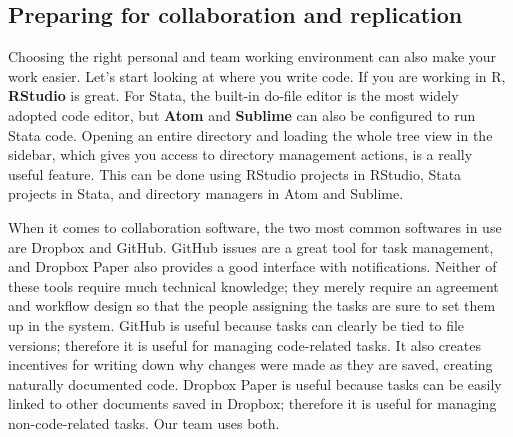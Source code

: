 \subsection{Preparing for collaboration and replication}

Choosing the right personal and team working environment can also make your work easier.
Let's start looking at where you write code.
If you are working in R, \textbf{RStudio} is great.
For Stata, the built-in do-file editor is the most widely adopted code editor,
but \textbf{Atom} and \textbf{Sublime} can also be configured to run Stata code.
Opening an entire directory and loading the whole tree view in the sidebar,
which gives you access to directory management actions, is a really useful feature.
This can be done using RStudio projects in RStudio, Stata projects in Stata, and directory managers in Atom and Sublime.


When it comes to collaboration software,
the two most common softwares in use are Dropbox and GitHub.
GitHub issues are a great tool for task management,
and Dropbox Paper also provides a good interface with notifications.
Neither of these tools require much technical knowledge;
they merely require an agreement and workflow design
so that the people assigning the tasks
are sure to set them up in the system.
GitHub is useful because tasks can clearly be tied to file versions;
therefore it is useful for managing code-related tasks.
It also creates incentives for writing down why changes were made as they are saved,
creating naturally documented code.
Dropbox Paper is useful because tasks can be easily linked to other documents saved in Dropbox;
therefore it is useful for managing non-code-related tasks.
Our team uses both.
